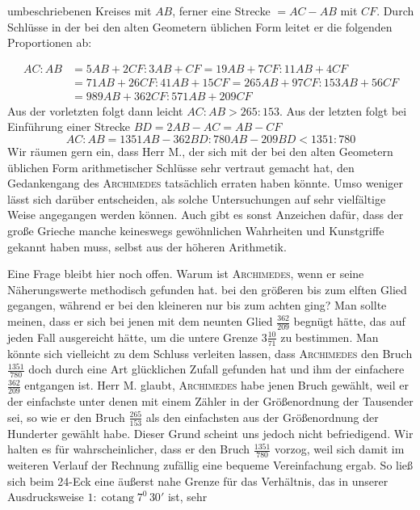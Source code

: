 %
umbeschriebenen Kreises mit \(AB\), ferner eine Strecke \(=AC-AB\) mit \(CF\). Durch Schlüsse in der bei den alten Geometern üblichen Form leitet er die folgenden Proportionen ab:
\par
{\fontsize{10}{12}\selectfont
\[
\begin{aligned}
AC:AB&=5AB+2CF:3AB+CF=19AB+7CF:11AB+4CF\\
&=71AB+26CF:41AB+15CF=265AB+97CF:153AB+56CF\\
&=989AB+362CF:571AB+209CF
\end{aligned}
\]
}
Aus der vorletzten folgt dann leicht \(AC:AB>265:153\). Aus der letzten folgt bei Einführung einer Strecke \(BD=2AB-AC=AB-CF\)
\[
AC:AB=1351AB-362BD:780AB-209BD<1351:780
\]
Wir räumen gern ein, dass Herr M., der sich mit der bei den alten Geometern üblichen Form arithmetischer Schlüsse sehr vertraut gemacht hat, den Gedankengang des \textsc{Archimedes} tatsächlich erraten haben könnte. Umso weniger lässt sich darüber entscheiden, als solche Untersuchungen auf sehr vielfältige Weise angegangen werden können. Auch gibt es sonst Anzeichen dafür, dass der große Grieche manche keineswegs gewöhnlichen Wahrheiten und Kunstgriffe gekannt haben muss, selbst aus der höheren Arithmetik.

Eine Frage bleibt hier noch offen. Warum ist \textsc{Archimedes}, wenn er seine Näherungswerte methodisch gefunden hat. bei den größeren bis zum elften Glied gegangen, während er bei den kleineren nur bis zum achten ging? Man sollte meinen, dass er sich bei jenen mit dem neunten Glied \(\frac{362}{209}\) begnügt hätte, das auf jeden Fall ausgereicht hätte, um die untere Grenze \(3\frac{10}{71}\) zu bestimmen. Man könnte sich vielleicht zu dem Schluss verleiten lassen, dass \textsc{Archimedes} den Bruch \(\frac{1351}{780}\) doch durch eine Art glücklichen Zufall gefunden hat und ihm der einfachere \(\frac{362}{209}\) entgangen ist. Herr M. glaubt, \textsc{Archimedes} habe jenen Bruch gewählt, weil er der einfachste unter denen mit einem Zähler in der Größenordnung der Tausender sei, so wie er den Bruch \(\frac{265}{153}\) als den einfachsten aus der Größenordnung der Hunderter gewählt habe. Dieser Grund scheint uns jedoch nicht befriedigend. Wir halten es für wahrscheinlicher, dass er den Bruch \(\frac{1351}{780}\) vorzog, weil sich damit im weiteren Verlauf der Rechnung zufällig eine bequeme Vereinfachung ergab. So ließ sich beim 24-Eck eine äußerst nahe Grenze für das Verhältnis, das in unserer Ausdrucksweise \(1:\operatorname{cotang}7^0\,30'\) ist, sehr %

